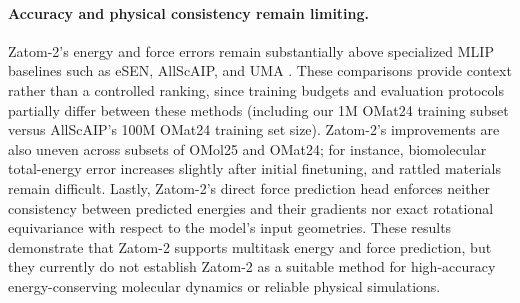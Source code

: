 \documentclass{article} %
\begin{document}
\paragraph{Accuracy and physical consistency remain limiting.} Zatom-2's energy and force errors remain substantially above specialized MLIP baselines such as eSEN, AllScAIP, and UMA \citep{morehead2026zatom1,qu2026allscaip,wood2025uma}. These comparisons provide context rather than a controlled ranking, since training budgets and evaluation protocols partially differ between these methods (including our 1M OMat24 training subset versus AllScAIP's 100M OMat24 training set size). Zatom-2's improvements are also uneven across subsets of OMol25 and OMat24; for instance, biomolecular total-energy error increases slightly after initial finetuning, and rattled materials remain difficult. Lastly, Zatom-2's direct force prediction head enforces neither consistency between predicted energies and their gradients nor exact rotational equivariance with respect to the model's input geometries. These results demonstrate that Zatom-2 supports multitask energy and force prediction, but they currently do not establish Zatom-2 as a suitable method for high-accuracy energy-conserving molecular dynamics or reliable physical simulations.
\end{document}
